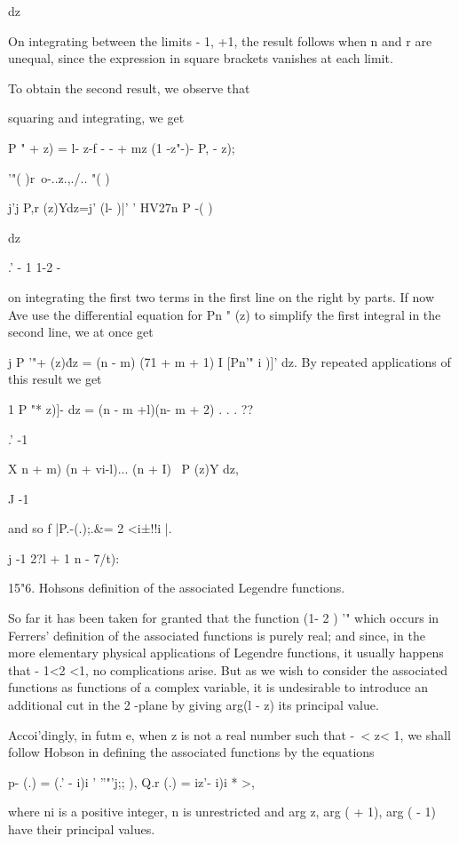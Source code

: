 {{{dz

%
%

On integrating between the limits - 1, +1, the result follows when n
and r are unequal, since the expression in square brackets vanishes at
each limit.

To obtain the second result, we observe that

squaring and integrating, we get

P " + z) = l- z-f - - + mz (1 -z"-)- P, - z);

  '"( )r\ o-..z.,./.. "( )

j'j P,r (z)Ydz=j' (l- )|' ' HV27n P -( )

dz

.' - 1 1-2 -

on integrating the first two terms in the first line on the right by
parts. If now Ave use the differential equation for Pn " (z) to
simplify the first integral in the second line, we at once get

j P '"+ (z)\' dz = (n - m) (71 + m + 1) I [Pn'" i )]' dz. By repeated
applications of this result we get

1 P "* z)]- dz = (n - m +l)(n- m + 2) . . . ??

.' -1

X n + m) (n + vi-l)... (n + I) \ P (z)Y dz,

J -1

and so f |P.-(.);.\&= 2 <i±!!i |.

j -1 2?l + 1 n - 7/t):

15"6. Hohsons definition of the associated Legendre functions.

So far it has been taken for granted that the function (1- 2 ) '"
which occurs in Ferrers' definition of the associated functions is
purely real; and since, in the more elementary physical applications
of Legendre functions, it usually happens that - 1<2 <1, no
complications arise. But as we wish to consider the associated
functions as functions of a complex variable, it is undesirable to
introduce an additional cut in the 2 -plane by giving arg(l - z) its
principal value.

Accoi'dingly, in futm e, when z is not a real number such that -\ < z<
1, we shall follow Hobson in defining the associated functions by the
equations

p- (.) = (.' - i)i ' ''"'j;; ), Q.r (.) = iz'- i)i * >,

where ni is a positive integer, n is unrestricted and arg z, arg ( +
1), arg ( - 1) have their principal values.

}}}
